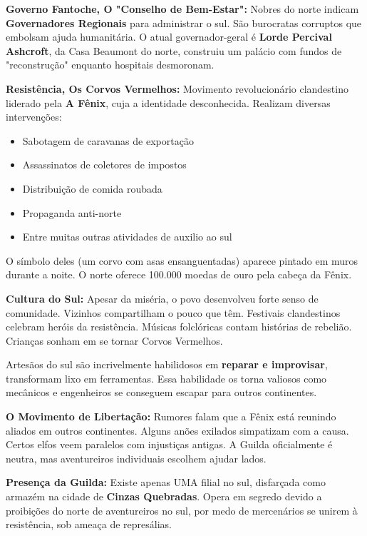 \textbf{\ringmfamily Governo Fantoche, O "Conselho de Bem-Estar":}
Nobres do norte indicam \textbf{Governadores Regionais} para administrar o sul. São burocratas corruptos que embolsam ajuda humanitária. O atual governador-geral é \textbf{Lorde Percival Ashcroft}, da Casa Beaumont do norte, construiu um palácio com fundos de "reconstrução" enquanto hospitais desmoronam.

\textbf{\ringmfamily Resistência, Os Corvos Vermelhos:}
Movimento revolucionário clandestino liderado pela \textbf{A Fênix}, cuja a identidade desconhecida. Realizam diversas intervenções:
\begin{itemize}
    \item Sabotagem de caravanas de exportação
    \item Assassinatos de coletores de impostos
    \item Distribuição de comida roubada
    \item Propaganda anti-norte
    \item Entre muitas outras atividades de auxilio ao sul
\end{itemize}
O símbolo deles (um corvo com asas ensanguentadas) aparece pintado em muros durante a noite. O norte oferece 100.000 moedas de ouro pela cabeça da Fênix.

\textbf{\ringmfamily Cultura do Sul:}
Apesar da miséria, o povo desenvolveu forte senso de comunidade. Vizinhos compartilham o pouco que têm. Festivais clandestinos celebram heróis da resistência. Músicas folclóricas contam histórias de rebelião. Crianças sonham em se tornar Corvos Vermelhos.

Artesãos do sul são incrivelmente habilidosos em \textbf{reparar e improvisar}, transformam lixo em ferramentas. Essa habilidade os torna valiosos como mecânicos e engenheiros se conseguem escapar para outros continentes.

\textbf{\ringmfamily O Movimento de Libertação:}
Rumores falam que a Fênix está reunindo aliados em outros continentes. Alguns anões exilados simpatizam com a causa. Certos elfos veem paralelos com injustiças antigas. A Guilda oficialmente é neutra, mas aventureiros individuais escolhem ajudar lados.

\textbf{\ringmfamily Presença da Guilda:}
Existe apenas UMA filial no sul, disfarçada como armazém na cidade de \textbf{Cinzas Quebradas}. Opera em segredo devido a proibições do norte de aventureiros no sul, por medo de mercenários se unirem à resistência, sob ameaça de represálias.

